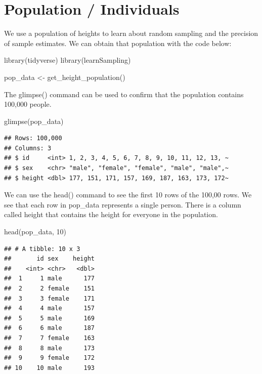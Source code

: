\documentclass[
]{krantz}
\makeatletter
\newenvironment{Shaded}{\begin{snugshade}}{\end{snugshade}}
\newcommand{\DecValTok}[1]{\textcolor[rgb]{0.06,0.06,0.06}{#1}}
\newcommand{\FunctionTok}[1]{\textcolor[rgb]{0,0,0}{#1}}
\newcommand{\NormalTok}[1]{#1}
\newcommand{\OtherTok}[1]{\textcolor[rgb]{0.37,0.37,0.37}{#1}}
\newenvironment{kframe}{%
\medskip{}
\setlength{\fboxsep}{.8em}
 \def\at@end@of@kframe{}%
 \ifinner\ifhmode%
  \def\at@end@of@kframe{\end{minipage}}%
  \begin{minipage}{\columnwidth}%
 \fi\fi%
 \def\FrameCommand##1{\hskip\@totalleftmargin \hskip-\fboxsep
 \colorbox{shadecolor}{##1}\hskip-\fboxsep
     \hskip-\linewidth \hskip-\@totalleftmargin \hskip\columnwidth}%
 \MakeFramed {\advance\hsize-\width
   \@totalleftmargin\z@ \linewidth\hsize
   \@setminipage}}%
 {\par\unskip\endMakeFramed%
 \at@end@of@kframe}
\renewenvironment{Shaded}{\begin{kframe}}{\end{kframe}}
\makeatother
\begin{document}
\hypertarget{population-individuals}{%
\section{Population / Individuals}\label{population-individuals}}

We use a population of heights to learn about random sampling and the precision of sample estimates. We can obtain that population with the code below:

\begin{Shaded}
\begin{Highlighting}[]
\FunctionTok{library}\NormalTok{(tidyverse)}
\FunctionTok{library}\NormalTok{(learnSampling)}

\NormalTok{pop\_data }\OtherTok{\textless{}{-}} \FunctionTok{get\_height\_population}\NormalTok{() }
\end{Highlighting}
\end{Shaded}

The glimpse() command can be used to confirm that the population contains 100,000 people.

\begin{Shaded}
\begin{Highlighting}[]
\FunctionTok{glimpse}\NormalTok{(pop\_data)}
\end{Highlighting}
\end{Shaded}

\begin{verbatim}
## Rows: 100,000
## Columns: 3
## $ id     <int> 1, 2, 3, 4, 5, 6, 7, 8, 9, 10, 11, 12, 13, ~
## $ sex    <chr> "male", "female", "female", "male", "male",~
## $ height <dbl> 177, 151, 171, 157, 169, 187, 163, 173, 172~
\end{verbatim}

We can use the head() command to see the first 10 rows of the 100,00 rows. We see that each row in pop\_data represents a single person. There is a column called height that contains the height for everyone in the population.

\begin{Shaded}
\begin{Highlighting}[]
\FunctionTok{head}\NormalTok{(pop\_data, }\DecValTok{10}\NormalTok{)}
\end{Highlighting}
\end{Shaded}

\begin{verbatim}
## # A tibble: 10 x 3
##       id sex    height
##    <int> <chr>   <dbl>
##  1     1 male      177
##  2     2 female    151
##  3     3 female    171
##  4     4 male      157
##  5     5 male      169
##  6     6 male      187
##  7     7 female    163
##  8     8 male      173
##  9     9 female    172
## 10    10 male      193
\end{verbatim}
\end{document}
